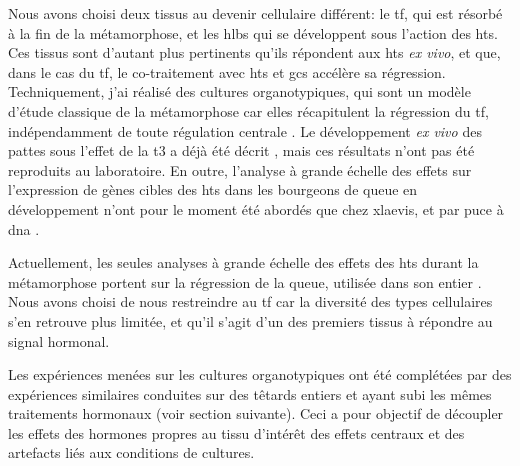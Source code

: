 \documentclass[../main.tex]{subfiles}
\begin{document}
Nous avons choisi deux tissus au devenir cellulaire différent: le \gls{tf}, qui est résorbé à la fin de la métamorphose, et les \glspl{hlb} qui se développent sous l'action des \glspl{ht}.
Ces tissus sont d'autant plus pertinents qu'ils répondent aux \glspl{ht} \textit{ex vivo}, et que, dans le cas du \gls{tf}, le co-traitement avec \glspl{ht} et \glspl{gc} accélère sa régression.
Techniquement, j'ai réalisé des cultures organotypiques, qui sont un modèle d'étude classique de la métamorphose car elles récapitulent la régression du \gls{tf}, indépendamment de toute régulation centrale \citep{Kikuyama1982,Kikuyama1983,Galton1990}.
Le développement \textit{ex vivo} des pattes sous l'effet de la \gls{t3} a déjà été décrit \citep{Tata1991}, mais ces résultats n'ont pas été reproduits au laboratoire.
En outre, l'analyse à grande échelle des effets sur l'expression de gènes cibles des \glspl{ht} dans les bourgeons de queue en développement n'ont pour le moment été abordés que chez \gls{xlaevis}, et par puce à \gls{dna} \citep{Buckbinder1992}.
\par
Actuellement, les seules analyses à grande échelle des effets des \glspl{ht} durant la métamorphose portent sur la régression de la queue, utilisée dans son entier \citep{Wang1993,Helbing2003,Kulkarni2012}.
Nous avons choisi de nous restreindre au \gls{tf} car la diversité des types cellulaires s'en retrouve plus limitée, et qu'il s'agit d'un des premiers tissus à répondre au signal hormonal.
\par
Les expériences menées sur les cultures organotypiques ont été complétées par des expériences similaires conduites sur des têtards entiers et ayant subi les mêmes traitements hormonaux (voir section suivante).
Ceci a pour objectif de découpler les effets des hormones propres au tissu d'intérêt des effets centraux et des artefacts liés aux conditions de cultures.
%
\end{document}
